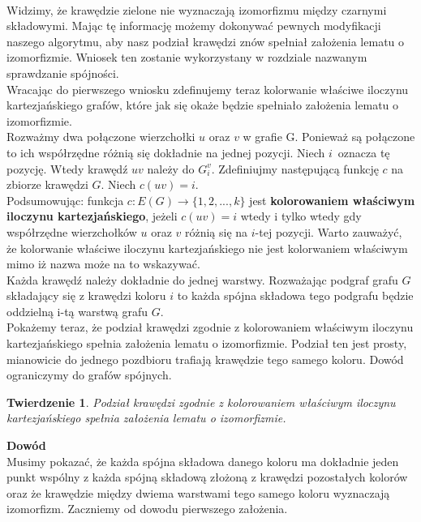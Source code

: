 \documentclass[12pt,a4paper,titlepage]{article}
\newtheorem{twr}{Twierdzenie}
\newcommand\tab[1][1cm]{\hspace*{#1}}
\begin{document}
\\
\tab[0.6cm]Widzimy, że krawędzie zielone nie wyznaczają izomorfizmu między czarnymi składowymi. Mając tę informację możemy dokonywać pewnych modyfikacji naszego algorytmu, aby nasz podział krawędzi znów spełniał założenia lematu o izomorfizmie. Wniosek ten zostanie wykorzystany w rozdziale nazwanym sprawdzanie spójności.\\
\tab[0.6cm]Wracając do pierwszego wniosku zdefinujemy teraz kolorwanie właściwe iloczynu kartezjańskiego grafów, które jak się okaże będzie spełniało założenia lematu o izomorfizmie.\\

Rozważmy dwa połączone wierzchołki $u$ oraz $v$ w grafie G. Ponieważ są połączone to ich współrzędne różnią się dokładnie na jednej pozycji. Niech $i$~oznacza tę pozycję. Wtedy krawędź $uv$ należy do $G_i^v$. Zdefiniujmy następującą funkcję $c$ na zbiorze krawędzi $G$. Niech $c(uv) = i$.\\
\tab[0.6cm]Podsumowując: funkcja $c: E(G) \rightarrow \{1,2,...,k\}$ jest \textbf{kolorowaniem właściwym iloczynu kartezjańskiego}, jeżeli $c(uv) = i $ wtedy i tylko wtedy gdy współrzędne wierzchołków $u$ oraz $v$ różnią się na $i$-tej pozycji. Warto zauważyć, że kolorwanie właściwe iloczynu kartezjańskiego nie jest kolorwaniem właściwym mimo iż nazwa może na to wskazywać.\\
\tab[0.6cm]Każda krawędź należy dokładnie do jednej warstwy. Rozważając podgraf grafu $G$ składający się z krawędzi koloru $i$ to każda spójna składowa tego podgrafu będzie oddzielną i-tą warstwą grafu $G$.\\
\tab[0.6cm]Pokażemy teraz, że podział krawędzi zgodnie z kolorowaniem właściwym iloczynu kartezjańskiego spełnia założenia lematu o izomorfizmie. Podział ten jest prosty, mianowicie do jednego pozdbioru trafiają krawędzie tego samego koloru. Dowód ograniczymy do grafów spójnych.\\
\begin{twr}
Podział krawędzi zgodnie z kolorowaniem właściwym iloczynu kartezjańskiego spełnia założenia lematu o izomorfizmie.
\end{twr}
\tab[-0.6cm]\textbf{Dowód}\\
\tab[0.6cm]Musimy pokazać, że każda spójna składowa danego koloru ma dokładnie jeden punkt wspólny z każda spójną składową złożoną z krawędzi pozostałych kolorów oraz że krawędzie między dwiema warstwami tego samego koloru wyznaczają izomorfizm. Zaczniemy od dowodu pierwszego założenia.\\   
\end{document}
